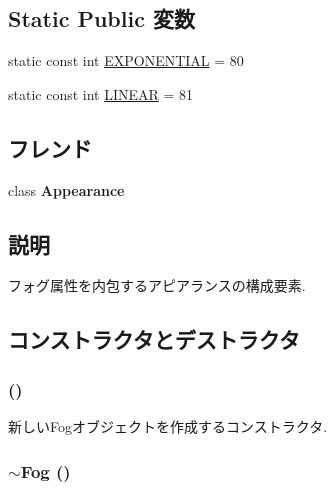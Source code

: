 \subsection*{Static Public 変数}
\begin{CompactItemize}
\item 
static const int \hyperlink{classm3g_1_1Fog_86b391da2e58c0448712a10f6609a62c}{EXPONENTIAL} = 80
\item 
static const int \hyperlink{classm3g_1_1Fog_23ccf193c67257f1be26417041cecb31}{LINEAR} = 81
\end{CompactItemize}
\subsection*{フレンド}
\begin{CompactItemize}
\item 
\hypertarget{classm3g_1_1Fog_afa5201a494f65c37039281d9b63a2a9}{
class \textbf{Appearance}}
\label{classm3g_1_1Fog_afa5201a494f65c37039281d9b63a2a9}

\end{CompactItemize}


\subsection{説明}
フォグ属性を内包するアピアランスの構成要素. 

\subsection{コンストラクタとデストラクタ}
\hypertarget{classm3g_1_1Fog_232ea9c5f5824d924fa185401fbfb234}{
\subsubsection[{Fog}]{ ()}}
\label{classm3g_1_1Fog_232ea9c5f5824d924fa185401fbfb234}


新しいFogオブジェクトを作成するコンストラクタ. \hypertarget{classm3g_1_1Fog_c13d77e65284ed8f7480c8f83ed9780f}{
\subsubsection[{$\sim$Fog}]{\setlength{\rightskip}{0pt plus 5cm}$\sim${\bf Fog} ()}}
\label{classm3g_1_1Fog_c13d77e65284ed8f7480c8f83ed9780f}


